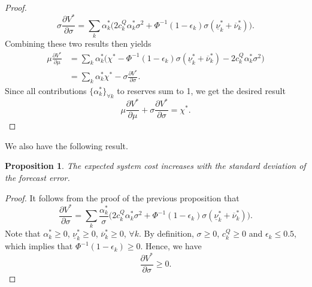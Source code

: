 \documentclass{article}
\newtheorem{proposition}{Proposition}
\begin{document}
\begin{proof}
\begin{equation*}
\sigma \frac{\partial V^*}{\partial \sigma} = \sum_k \alpha_k^*\Big(2c_k^Q\alpha_k^*\sigma^2 + \Phi^{-1}(1-\epsilon_k) \sigma (\underline{\nu}_k^* + \overline{\nu}_k^*)\Big).
\end{equation*}
Combining these two results then yields
\begin{align*}
\mu \frac{\partial V^*}{\partial \mu} &= \sum_k\alpha_k^*\Big(\chi^* - \Phi^{-1}(1-\epsilon_k) \sigma(\underline{\nu}_k^*+\overline{\nu}_k^*) - 2c_k^Q \alpha_k^* \sigma^2\Big)\\
&= \sum_k\alpha_k^*\chi^* - \sigma \frac{\partial V^*}{\partial \sigma}.
\end{align*}
Since all contributions $\{\alpha_k^*\}_{\forall k}$ to reserves sum to 1, we get the desired result
\begin{equation*}
\mu \frac{\partial V^*}{\partial \mu} + \sigma \frac{\partial V^*}{\partial \sigma} = \chi^*.
\end{equation*}
\end{proof}
We also have the following result.
\begin{proposition}
The expected system cost increases with the standard deviation of the forecast error.
\end{proposition}
\begin{proof}
It follows from the proof of the previous proposition that
\begin{equation*}
\frac{\partial V^*}{\partial \sigma} = \sum_k\frac{\alpha_k^*}{\sigma}\Big(2c_k^Q\alpha_k^*\sigma^2 + \Phi^{-1}(1-\epsilon_k) \sigma (\underline{\nu}_k^* + \overline{\nu}_k^*)\Big).
\end{equation*}
Note that $\alpha_k^* \ge 0$, $\underline{\nu}_k^* \ge 0$, $\overline{\nu}_k^* \ge 0$, $\forall k$. By definition, $\sigma \ge 0$, $c_k^Q \ge 0$ and $\epsilon_k \le 0.5$, which implies that $\Phi^{-1}(1-\epsilon_k) \ge 0$. Hence, we have
\begin{equation*}
\frac{\partial V^*}{\partial \sigma} \ge 0.
\end{equation*}
\end{proof}

%
\end{document}

